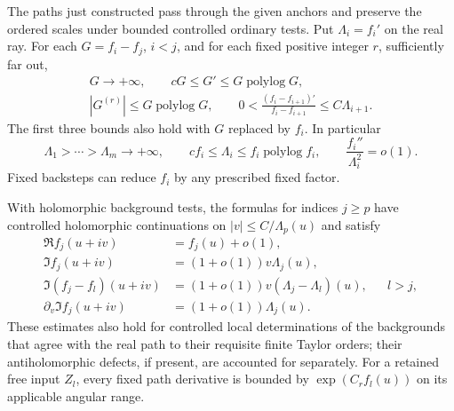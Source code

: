 \begin{lemma}\label{lem:flags-path}
The paths just constructed pass through the given anchors and
preserve the ordered scales under bounded controlled ordinary tests.
Put $\Lambda_i=f_i'$ on the real ray. For each $G=f_i-f_j$, $i<j$,
and for each fixed positive integer $r$, sufficiently far out,
\begin{equation}\label{eq:flags-real}
 \begin{gathered}
 G\longrightarrow+\infty,\qquad
 cG\le G'\le G\operatorname{polylog}G,\\
 |G^{(r)}|\le G\operatorname{polylog}G,\qquad
 0<\frac{(f_i-f_{i+1})'}{f_i-f_{i+1}}
       \le C\Lambda_{i+1}.
 \end{gathered}
\end{equation}
The first three bounds also hold with $G$ replaced by $f_i$.
In particular
\begin{equation}\label{eq:flags-rates}
 \Lambda_1>\cdots>\Lambda_m\longrightarrow+\infty,
 \qquad cf_i\le\Lambda_i\le f_i\operatorname{polylog}f_i,
 \qquad \frac{f_i''}{\Lambda_i^2}=o(1).
\end{equation}
Fixed backsteps can reduce $f_i$ by any prescribed fixed factor.

With holomorphic background tests, the formulas for indices $j\ge p$
have controlled holomorphic continuations on $|v|\le C/\Lambda_p(u)$
and satisfy
\begin{equation}\label{eq:flags-angular}
 \begin{aligned}
 \Re f_j(u+iv)&=f_j(u)+o(1),\\
 \Im f_j(u+iv)&=(1+o(1))v\Lambda_j(u),\\
 \Im(f_j-f_l)(u+iv)&=(1+o(1))v(\Lambda_j-\Lambda_l)(u),
                       && l>j,\\
 \partial_v\Im f_j(u+iv)&=(1+o(1))\Lambda_j(u).
 \end{aligned}
\end{equation}
These estimates also hold for controlled local determinations of the
backgrounds that agree with the real path to their requisite finite
Taylor orders; their antiholomorphic defects, if present, are accounted
for separately. For a retained free input $Z_l$, every fixed path
derivative is bounded by $\exp(C_r f_l(u))$ on its applicable angular
range.
\end{lemma}

